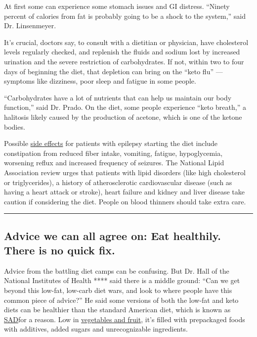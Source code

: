 At first some can experience some stomach issues and GI distress.
``Ninety percent of calories from fat is probably going to be a shock to
the system,'' said Dr. Linsenmeyer.

It's crucial, doctors say, to consult with a dietitian or physician,
have cholesterol levels regularly checked, and replenish the fluids and
sodium lost by increased urination and the severe restriction of
carbohydrates. If not, within two to four days of beginning the diet,
that depletion can bring on the ``keto flu'' --- symptoms like
dizziness, poor sleep and fatigue in some people.

``Carbohydrates have a lot of nutrients that can help us maintain our
body function,'' said Dr. Prado. On the diet, some people experience
``keto breath,'' a halitosis likely caused by the production of acetone,
which is one of the ketone bodies.

Possible
\href{https://www.epilepsybehavior.com/article/S1525-5050(11)00112-0/abstract}{side
effects} for patients with epilepsy starting the diet include
constipation from reduced fiber intake, vomiting, fatigue, hypoglycemia,
worsening reflux and increased frequency of seizures. The National Lipid
Association review urges that patients with lipid disorders (like high
cholesterol or triglycerides), a history of atherosclerotic
cardiovascular disease (such as having a heart attack or stroke), heart
failure and kidney and liver disease take caution if considering the
diet. People on blood thinners should take extra care.

\begin{center}\rule{0.5\linewidth}{\linethickness}\end{center}

\hypertarget{advice-we-can-all-agree-on-eat-healthily-there-is-no-quick-fix}{%
\subsection{Advice we can all agree on: Eat healthily. There is no quick
fix.}\label{advice-we-can-all-agree-on-eat-healthily-there-is-no-quick-fix}}

Advice from the battling diet camps can be confusing. But Dr. Hall of
the National Institutes of Health **** said there is a middle ground:
``Can we get beyond this low-fat, low-carb diet wars, and look to where
people have this common piece of advice?'' He said some versions of both
the low-fat and keto diets can be healthier than the standard American
diet, which is known as
\href{https://www.nytimes.com/2019/04/26/books/review/self-help-diet-weight-good-health.html}{SAD}for
a reason. Low in
\href{https://health.gov/dietaryguidelines/2015/guidelines/chapter-1/}{vegetables
and fruit}, it's filled with prepackaged foods with additives, added
sugars and unrecognizable ingredients.

